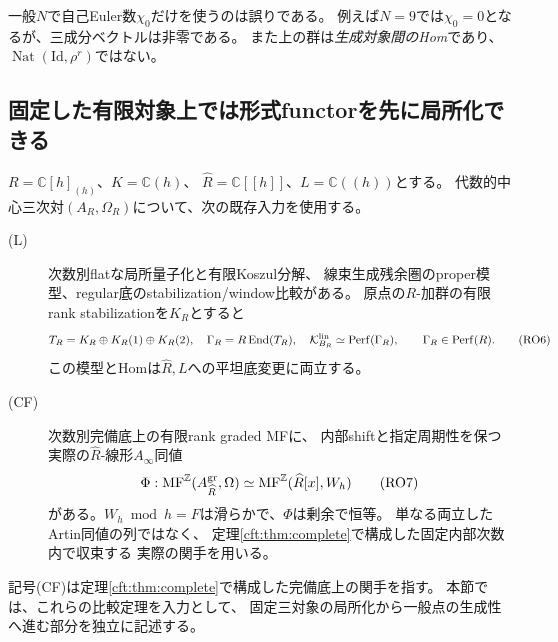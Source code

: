 \begin{remark}
一般$N$で自己Euler数$\chi_0$だけを使うのは誤りである。
例えば$N=9$では$\chi_0=0$となるが、三成分ベクトルは非零である。
また上の群は\emph{生成対象間のHom}であり、$\operatorname{Nat}(\mathrm{Id},\rho^r)$ではない。
\end{remark}

\subsection{固定した有限対象上では形式functorを先に局所化できる}

$R=\mathbb C[h]_{(h)}$、$K=\mathbb C(h)$、
$\widehat R=\mathbb C[[h]]$、$L=\mathbb C((h))$とする。
代数的中心三次対$(A_R,\Omega_R)$について、次の既存入力を使用する。
\begin{description}
\item[\textup{(L)}] 次数別flatな局所量子化と有限Koszul分解、
線束生成残余圏のproper模型、regular底のstabilization/window比較がある。
原点の$R$-加群の有限rank stabilizationを$K_R$とすると
\[
 T_R=K_R\oplus K_R(1)\oplus K_R(2),\quad
 \Gamma_R=R\operatorname{End}(T_R),\quad
 \mathcal K^{\rm lin}_{B_R}\simeq\operatorname{Perf}(\Gamma_R),
 \qquad \Gamma_R\in\operatorname{Perf}(R).
 \tag{RO6}\label{rog:eq:source}
\]
この模型とHomは$\widehat R,L$への平坦底変更に両立する。
\item[\textup{(CF)}] 次数別完備底上の有限rank graded MFに、
内部shiftと指定周期性を保つ実際の$\widehat R$-線形$A_\infty$同値
\[
 \Phi:\operatorname{MF}^{\mathbb Z}(A^{\rm gr}_{\widehat R},\Omega)
 \simeq\operatorname{MF}^{\mathbb Z}(\widehat R[x],W_h)
 \tag{RO7}\label{rog:eq:completed}
\]
がある。$W_h\bmod h=F$は滑らかで、$\Phi$は剰余で恒等。
単なる両立したArtin同値の列ではなく、
定理\ref{cft:thm:complete}で構成した固定内部次数内で収束する
実際の関手を用いる。
\end{description}
記号(CF)は定理\ref{cft:thm:complete}で構成した完備底上の関手を指す。
本節では、これらの比較定理を入力として、
固定三対象の局所化から一般点の生成性へ進む部分を独立に記述する。



